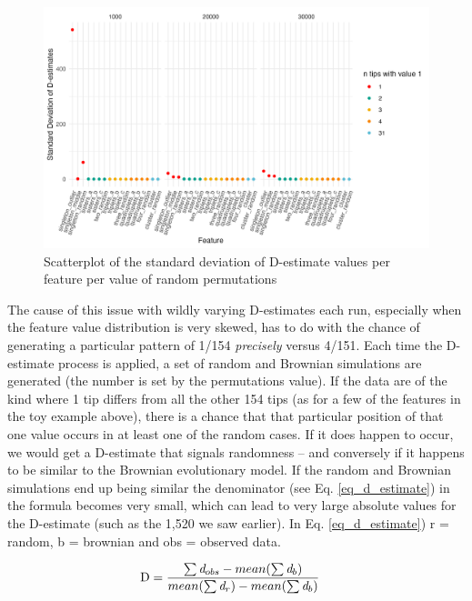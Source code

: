\documentclass[12pt,letterpaper]{article}
\begin{document}
\begin{figure}[!ht]
\centering
\includegraphics[width=14cm]{illustrations/plots_from_R/phylo_d_sd_permut.png}
\caption{Scatterplot of the standard deviation of D-estimate values per feature per value of random permutations}
\label{fig:phylo_d_plot_sd}
\end{figure}

The cause of this issue with wildly varying D-estimates each run, especially when the feature value distribution is very skewed, has to do with the chance of generating a particular pattern of 1/154 \emph{precisely} versus 4/151. Each time the D-estimate process is applied, a set of random and Brownian simulations are generated (the number is set by the permutations value). If the data are of the kind where 1 tip differs from all the other 154 tips (as for a few of the features in the toy example above), there is a chance that that particular position of that one value occurs in at least one of the random cases. If it does happen to occur, we would get a D-estimate that signals randomness -- and conversely if it happens to be similar to the Brownian evolutionary model. If the random and Brownian simulations end up being similar the denominator (see Eq. \ref{eq_d_estimate}) in the formula becomes very small, which can lead to very large absolute values for the D-estimate (such as the 1,520 we saw earlier). In Eq. \ref{eq_d_estimate}) \citep{fritz2010selectivity} r = random, b = brownian and obs = observed data.

\begin{align}
\label{eq_d_estimate}
    \text{D} 
         &=  \frac{\sum\emph{d}_{obs} - mean(\sum\emph{d}_{b})} {mean(\sum\emph{d}_{r}) - mean(\sum\emph{d}_{b})}
\end{align}
\end{document}

